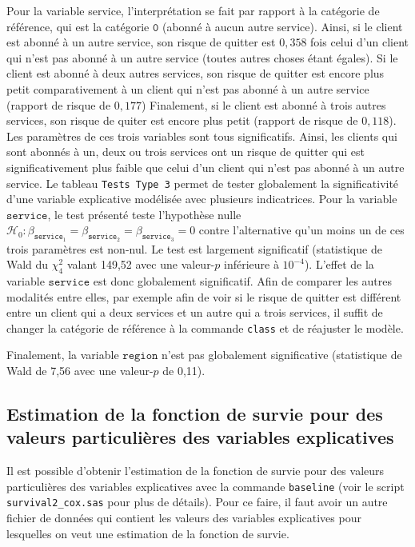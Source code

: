 \documentclass[
  11pt,
  letterpaper,
]{book}
\theoremstyle{definition}
\theoremstyle{definition}
\theoremstyle{definition}
\theoremstyle{definition}
\theoremstyle{remark}
\begin{document}
Pour la variable service, l'interprétation se fait par rapport à la catégorie de référence, qui est la catégorie \(\texttt{0}\) (abonné à aucun autre service). Ainsi, si le client est abonné à un autre service, son risque de quitter est \(0,358\) fois celui d'un client qui n'est pas abonné à un autre service (toutes autres choses étant égales). Si le client est abonné à deux autres services, son risque de quitter est encore plus petit comparativement à un client qui n'est pas abonné à un autre service (rapport de risque de \(0,177\)) Finalement, si le client est abonné à trois autres services, son risque de quiter est encore plus petit (rapport de risque de \(0,118\)). Les paramètres de ces trois variables sont tous significatifs. Ainsi, les clients qui sont abonnés à un, deux ou trois services ont un risque de quitter qui est significativement plus faible que celui d'un client qui n'est pas abonné à un autre service. Le tableau \texttt{Tests\ Type\ 3} permet de tester globalement la significativité d'une variable explicative modélisée avec plusieurs indicatrices. Pour la variable \(\texttt{service}\), le test présenté teste l'hypothèse nulle \(\mathcal{H}_0: \beta_{\texttt{service}_1}=\beta_{\texttt{service}_2}=\beta_{\texttt{service}_3}=0\) contre l'alternative qu'un moins un de ces trois paramètres est non-nul. Le test est largement significatif (statistique de Wald du \(\chi^2_4\) valant 149,52 avec une valeur-\(p\) inférieure à \(10^{-4}\)). L'effet de la variable \(\texttt{service}\) est donc globalement significatif. Afin de comparer les autres modalités entre elles, par exemple afin de voir si le risque de quitter est différent entre un client qui a deux services et un autre qui a trois services, il suffit de changer la catégorie de référence à la commande \texttt{class} et de réajuster le modèle.

Finalement, la variable \(\texttt{region}\) n'est pas globalement significative (statistique de Wald de 7,56 avec une valeur-\(p\) de 0,11).

\hypertarget{estimation-de-la-fonction-de-survie-pour-des-valeurs-particuliuxe8res-des-variables-explicatives}{%
\subsection{Estimation de la fonction de survie pour des valeurs particulières des variables explicatives}\label{estimation-de-la-fonction-de-survie-pour-des-valeurs-particuliuxe8res-des-variables-explicatives}}

Il est possible d'obtenir l'estimation de la fonction de survie pour des valeurs particulières des variables explicatives avec la commande \texttt{baseline} (voir le script \texttt{survival2\_cox.sas} pour plus de détails). Pour ce faire, il faut avoir un autre fichier de données qui contient les valeurs des variables explicatives pour lesquelles on veut une estimation de la fonction de survie.
\end{document}
